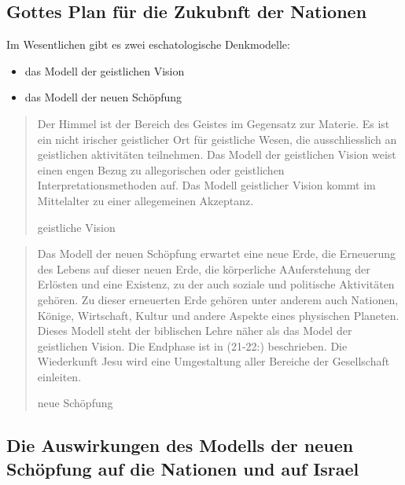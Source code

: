 \documentclass{../../inc/mybib}
\begin{document}
\subsection{Gottes Plan für die Zukubnft der Nationen}
Im Wesentlichen gibt es zwei eschatologische Denkmodelle:
\begin{itemize}
    \item das Modell der geistlichen Vision
    \item das Modell der neuen Schöpfung
\end{itemize}
\blockquote[geistliche Vision]{Der Himmel ist der Bereich des Geistes im Gegensatz zur Materie. Es ist ein nicht irischer geistlicher Ort für geistliche Wesen, die ausschliesslich an geistlichen aktivitäten teilnehmen. Das Modell der geistlichen Vision weist einen engen Bezug zu allegorischen oder geistlichen Interpretationsmethoden auf. Das Modell geistlicher Vision kommt im Mittelalter zu einer allegemeinen Akzeptanz.}
\blockquote[neue Schöpfung]{Das Modell der neuen Schöpfung erwartet eine neue Erde, die Erneuerung des Lebens auf dieser neuen Erde, die körperliche AAuferstehung der Erlösten und eine Existenz, zu der auch soziale und politische Aktivitäten gehören. Zu dieser erneuerten Erde gehören unter anderem auch Nationen, Könige, Wirtschaft, Kultur und andere Aspekte eines physischen Planeten. Dieses Modell steht der biblischen Lehre näher als das Model der geistlichen Vision. Die Endphase ist in (21-22:) beschrieben. Die Wiederkunft Jesu wird eine Umgestaltung aller Bereiche der Gesellschaft einleiten.}
\subsection{Die Auswirkungen des Modells der neuen Schöpfung auf die Nationen und auf Israel}
\end{document}
